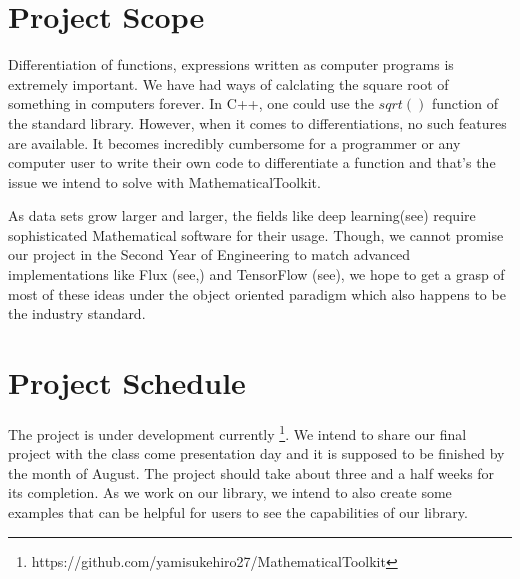 \documentclass[12pt]{article}
\begin{document}
\section{Project Scope}
Differentiation of functions, expressions written as computer programs
is extremely important. We have had ways of calclating the 
square root of something in computers forever. In C++, one could use
the $sqrt()$ function of the standard library. However, when it comes to 
differentiations, no such features are available. It becomes incredibly 
cumbersome for a programmer or any computer user to write their own 
code to differentiate a function and that's the issue we intend to solve
with MathematicalToolkit.


As data sets grow larger and larger, the fields like deep 
learning(see\cite{Goodfellow-et-al-2016}) require sophisticated 
Mathematical software for their usage. Though, we cannot promise 
our project in the Second Year of Engineering to match advanced 
implementations like Flux (see\cite{Fluxjl-2018},\cite{innes:2018}) and TensorFlow (see\cite{abadi2016tensorflow}),
we hope to get a grasp of most of these ideas under the object oriented 
paradigm which also happens to be the industry standard.



\section{Project Schedule}
The project is under development currently
\footnote{\label{MathematicalToolkit}https://github.com/yamisukehiro27/MathematicalToolkit}.
We intend to share our final project with the class come presentation 
day and it is supposed to be finished by the month of August.
The project should take about three and a half weeks for its completion.
As we work on our library, we intend to also create some examples
that can be helpful for users to see the capabilities of our library.


\newpage
\printbibliography
%
%
\end{document}
